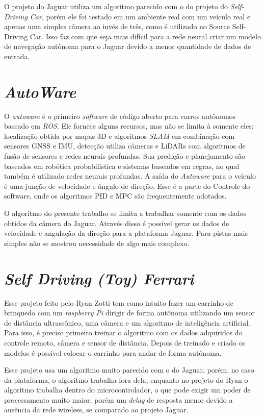O projeto do Jaguar utiliza um algoritmo parecido com o do projeto do \textit{Self-Driving Car}, porém ele foi testado em um ambiente real com um veículo real e apenas uma simples câmera ao invés de três, como é utilizado no Source Self-Driving Car. Isso faz com que seja mais difícil para a rede neural criar um modelo de navegação autônoma para o Jaguar devido a menor quantidade de dados de entrada.

\section{\textit{AutoWare}}

O \textit{autoware} é o primeiro \textit{software} de código aberto para carros autônomos baseado em \textit{ROS}. Ele fornece alguns recursos, mas não se limita à somente eles: localização obtida por mapas 3D e algoritmos \textit{SLAM} em combinação com sensores GNSS e IMU, detecção utiliza câmeras e LiDARs com algoritmos de fusão de sensores e redes neurais profundas. Sua predição e planejamento são baseados em robótica probabilística e sistemas baseados em regras, no qual também é utilizado redes neurais profundas. A saída do \textit{Autoware} para o veículo é uma junção de velocidade e ângulo de direção. Esse é a parte do Controle do software, onde os algoritmos PID e MPC são frequentemente adotados. \cite{autoware}

O algoritmo do presente trabalho se limita a trabalhar somente com os dados obtidos da câmera do Jaguar. Através disso é possível gerar os dados de velocidade e angulação da direção para a plataforma Jaguar. Para pistas mais simples não se mostrou necessidade de algo mais complexo.

\section{\textit{Self Driving (Toy) Ferrari}}
\label{Self_Driving_(Toy)_Ferrari}

Esse projeto feito pelo Ryan Zotti tem como intuito fazer um carrinho de brinquedo com um \textit{raspberry Pi} dirigir de forma autônoma utilizando um sensor de distância ultrassônico, uma câmera e um algoritmo de inteligência artificial. Para isso, é preciso primeiro treinar o algoritmo com os dados adquiridos do controle remoto, câmera e sensor de distância. Depois de treinado e criado os modelos é possível colocar o carrinho para andar de forma autônoma. \cite{selfdrivingcartoy}

Esse projeto usa um algoritmo muito parecido com o do Jaguar, porém, no caso da plataforma, o algoritmo trabalha fora dela, enquanto no projeto do Ryan o algoritmo trabalha dentro do microcontrolador, o que pode exigir um poder de processamento muito maior, porém um \textit{delay} de resposta menor devido a ausência da rede wireless, se comparado ao projeto Jaguar.

